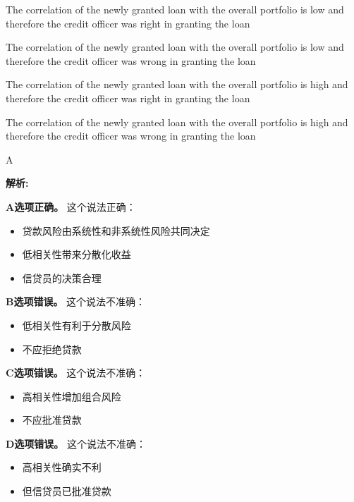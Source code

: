 \documentclass{article}
\newenvironment{explanation}
{\textbf{解析:}\par}
{\par}
\begin{document}
\begin{choices}
    \item The correlation of the newly granted loan with the overall portfolio is low and therefore the credit officer was right in granting the loan
    \item The correlation of the newly granted loan with the overall portfolio is low and therefore the credit officer was wrong in granting the loan
    \item The correlation of the newly granted loan with the overall portfolio is high and therefore the credit officer was right in granting the loan
    \item The correlation of the newly granted loan with the overall portfolio is high and therefore the credit officer was wrong in granting the loan
\end{choices}

\begin{correctanswer}
    A
\end{correctanswer}

\begin{explanation}
    \textbf{A选项正确。}
    这个说法正确：
    \begin{itemize}
        \item 贷款风险由系统性和非系统性风险共同决定
        \item 低相关性带来分散化收益
        \item 信贷员的决策合理
    \end{itemize}

    \textbf{B选项错误。}
    这个说法不准确：
    \begin{itemize}
        \item 低相关性有利于分散风险
        \item 不应拒绝贷款
    \end{itemize}

    \textbf{C选项错误。}
    这个说法不准确：
    \begin{itemize}
        \item 高相关性增加组合风险
        \item 不应批准贷款
    \end{itemize}

    \textbf{D选项错误。}
    这个说法不准确：
    \begin{itemize}
        \item 高相关性确实不利
        \item 但信贷员已批准贷款
    \end{itemize}
\end{explanation}
\end{document}
